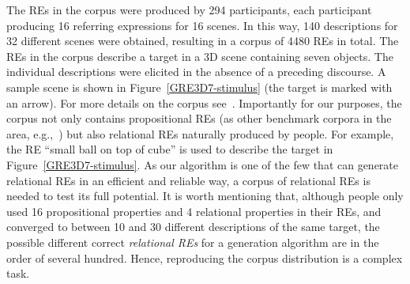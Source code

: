 The REs in the corpus were produced by 294 participants, each participant producing 16 referring expressions for 16 scenes. In this way, 140 descriptions for 32 different scenes were obtained, resulting in a corpus of 4480 REs in total. 
The REs in the corpus describe a target in a 3D scene containing seven objects. The individual descriptions were elicited in the absence of a preceding discourse. 
A sample scene is shown in Figure~\ref{GRE3D7-stimulus} (the target is marked with an arrow). For more details on the corpus see~\cite[Chapter 5]{viet:gene11}. Importantly for our purposes, the corpus not only contains propositional REs (as other benchmark corpora in the area, e.g.,~\cite{gatt-balz-kow:2008:ENLG}) but also relational REs naturally produced by people. For example, the RE ``small ball on top of cube'' is used to describe the target in Figure~\ref{GRE3D7-stimulus}. As our algorithm is one of the few that can generate relational REs in an efficient and reliable way, a corpus of relational REs is needed to test its full potential. It is worth mentioning that, although people only used 16 propositional properties and 4 relational properties in their REs, and converged to between 10 and 30 different descriptions of the same target, the possible different correct \emph{relational REs} for a generation algorithm are in the order of several hundred. Hence, reproducing the corpus distribution is a complex task.    
% 
%
